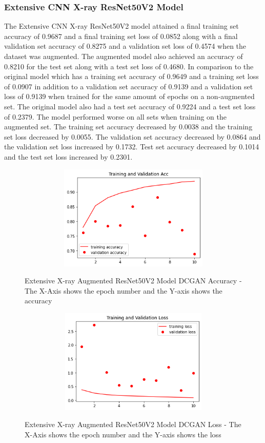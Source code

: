\subsubsection{Extensive CNN X-ray ResNet50V2 Model}
The Extensive CNN X-ray ResNet50V2 model attained a final training set accuracy of 0.9687 and a final training set loss of 0.0852 along with a final validation set accuracy of 0.8275 and a validation set loss of 0.4574 when the dataset was augmented.  The augmented model also achieved an accuracy of 0.8210 for the test set along with a test set loss of 0.4680.  In comparison to the original model which has a training set accuracy of 0.9649 and a training set loss of 0.0907 in addition to a validation set accuracy of 0.9139 and a validation set loss of 0.9139 when trained for the same amount of epochs on a non-augmented set.  The original model also had a test set accuracy of 0.9224 and a test set loss of 0.2379.  The model performed worse on all sets when training on the augmented set.  The training set accuracy decreased by 0.0038 and the training set loss decreased by 0.0055. The validation set accuracy decreased by 0.0864 and the validation set loss increased by 0.1732.  Test set accuracy decreased by 0.1014 and the test set loss increased by 0.2301.
 \begin{figure}[H]
    \centering    \includegraphics[width=1\textwidth,height=5cm,keepaspectratio]{Images/ResNet50V2BaselineTrainingValidationAccuracyExtensiveXray.png}\\
    \caption{Extensive X-ray Augmented ResNet50V2 Model DCGAN Accuracy - The X-Axis shows the epoch number and the Y-axis shows the accuracy}
    \label{fig:Extensive X-ray Augmented ResNet50V2 Model DCGAN Accuracy}
\end{figure}
 \begin{figure}[H]
    \centering
    \includegraphics[width=1\textwidth,height=5cm,keepaspectratio]{Images/ResNet50V2BaselineTrainingValidationLossExtensiveXrayAugmentedDCGAN.png}\\
    \caption{Extensive X-ray Augmented ResNet50V2 Model DCGAN Loss - The X-Axis shows the epoch number and the Y-axis shows the loss}
    \label{fig:Extensive X-ray Augmented ResNet50V2 Model DCGAN Loss}
\end{figure}
